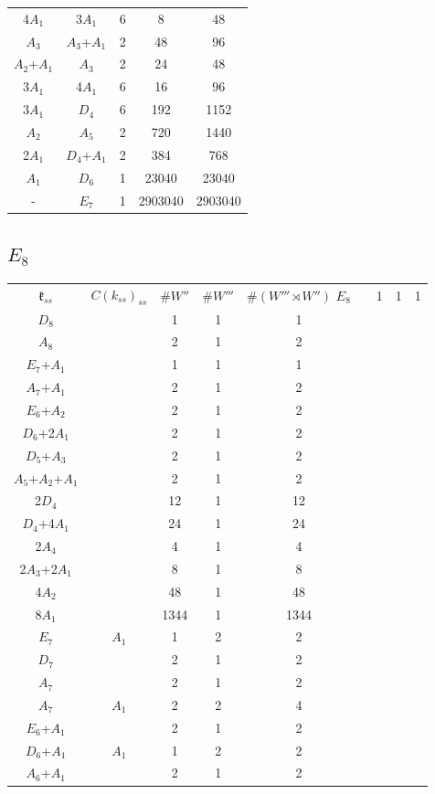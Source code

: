 \documentclass[12pt]{report}
\begin{document}
\begin{appendix}
{\begin{tabular}{ccccc}
4$A_1$ & 3$A_1$ & 6 & 8 & 48 \\
$A_3$ & $A_3$+$A_1$ & 2 & 48 & 96 \\
$A_2$+$A_1$ & $A_3$ & 2 & 24 & 48 \\
3$A_1$ & 4$A_1$ & 6 & 16 & 96 \\
3$A_1$ & $D_4$ & 6 & 192 & 1152 \\
$A_2$ & $A_5$ & 2 & 720 & 1440 \\
2$A_1$ & $D_4$+$A_1$ & 2 & 384 & 768 \\
$A_1$ & $D_6$ & 1 & 23040 & 23040 \\
- & $E_7$ & 1 & 2903040 & 2903040 \\
\end{tabular}

\subsection{$E_8$}
\begin{longtable}{ccccc}
$\mathfrak{k}_{ss}$& $C(k_{ss})_{ss}$ & $\#W''$ &$\#W'''$&$\#(W'''\rtimes W'')$ \endhead 
$E_8$ &  & 1 & 1 & 1\\
$D_8$ &  & 1 & 1 & 1 \\
$A_8$ &  & 2 & 1 & 2 \\
$E_7$+$A_1$ &  & 1 & 1 & 1 \\
$A_7$+$A_1$ &  & 2 & 1 & 2 \\
$E_6$+$A_2$ &  & 2 & 1 & 2 \\
$D_6$+2$A_1$ &  & 2 & 1 & 2 \\
$D_5$+$A_3$ &  & 2 & 1 & 2 \\
$A_5$+$A_2$+$A_1$ &  & 2 & 1 & 2 \\
2$D_4$ &  & 12 & 1 & 12 \\
$D_4$+4$A_1$ &  & 24 & 1 & 24 \\
2$A_4$ &  & 4 & 1 & 4 \\
2$A_3$+2$A_1$ &  & 8 & 1 & 8 \\
4$A_2$ &  & 48 & 1 & 48 \\
8$A_1$ &  & 1344 & 1 & 1344 \\
$E_7$ & $A_1$ & 1 & 2 & 2 \\
$D_7$ &  & 2 & 1 & 2 \\
$A_7$ &  & 2 & 1 & 2 \\
$A_7$ & $A_1$ & 2 & 2 & 4 \\
$E_6$+$A_1$ &  & 2 & 1 & 2 \\
$D_6$+$A_1$ & $A_1$ & 1 & 2 & 2 \\
$A_6$+$A_1$ &  & 2 & 1 & 2 \\

\end{longtable}}
\end{appendix}
\end{document}
